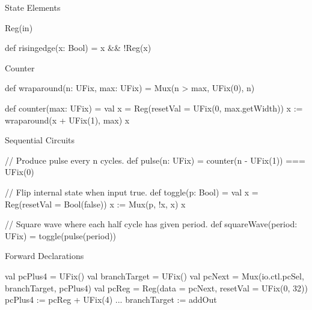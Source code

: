 \documentclass[xcolor=pdflatex,dvipsnames,table]{beamer}
\begin{document}
\begin{frame}[fragile]{State Elements}

\begin{scala}
Reg(in)
\end{scala}

\begin{scala}
def risingedge(x: Bool) = x && !Reg(x)
\end{scala}

\end{frame}

\begin{frame}[fragile]{Counter}

\begin{scala}
def wraparound(n: UFix, max: UFix) =
  Mux(n > max, UFix(0), n)

def counter(max: UFix) = {
  val x = Reg(resetVal = UFix(0, max.getWidth))
  x := wraparound(x + UFix(1), max)
  x
}
\end{scala}

\end{frame}

\begin{frame}[fragile]{Sequential Circuits}

\begin{scala}
// Produce pulse every n cycles.
def pulse(n: UFix) = 
  counter(n - UFix(1)) === UFix(0)
\end{scala}

\begin{scala}
// Flip internal state when input true.
def toggle(p: Bool) = {
  val x = Reg(resetVal = Bool(false))
  x := Mux(p, !x, x)
  x
}

// Square wave where each half cycle has given period.
def squareWave(period: UFix) = 
  toggle(pulse(period))
\end{scala}

\end{frame}

\begin{frame}[fragile]{Forward Declarations}

\begin{scala}
val pcPlus4      = UFix() 
val branchTarget = UFix()
val pcNext       = Mux(io.ctl.pcSel, branchTarget, pcPlus4)
val pcReg        = Reg(data = pcNext, resetVal = UFix(0, 32)) 
pcPlus4         := pcReg + UFix(4) 
... 
branchTarget    := addOut
\end{scala}

\end{frame}
\end{document}
